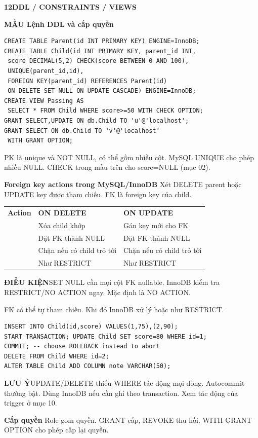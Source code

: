 \documentclass[a4paper]{article}
\newcommand{\sqlfont}{\ttfamily}
\newcommand{\bodyfontsize}{5.55}
\newcommand{\bodyleading}{5.2}
\newlength{\gutter}\setlength{\gutter}{1.5mm}
\newcommand{\bodylineskiplimit}{-2pt}
\newcommand{\bodystyle}{%
  \fontsize{\bodyfontsize}{\bodyleading}\selectfont\setlength{\lineskiplimit}{\bodylineskiplimit}\RaggedRight
  \setlength{\abovedisplayskip}{.5pt}\setlength{\belowdisplayskip}{.5pt}%
  \setlength{\abovedisplayshortskip}{.3pt}\setlength{\belowdisplayshortskip}{.3pt}}
\newcommand{\topic}[2]{\par\addvspace{.45pt}\nointerlineskip%
  \begingroup\setlength{\fboxsep}{0.35pt}%
  \noindent\colorbox{structure}{\parbox{\dimexpr\linewidth-2\fboxsep\relax}{%
    \color{white}\fontsize{6.45}{6.8}\selectfont\bfseries #1\enspace #2}}%
  \endgroup\par\nobreak\vspace{.55pt}\nointerlineskip\nobreak}
\newenvironment{topicblock}
  {\par\bodystyle}
  {\par}
\newcommand{\key}[1]{\par\textcolor{structure}{\textbf{#1}}\enspace}
\newcommand{\note}[4]{\par\nointerlineskip\vspace{.25pt}\begingroup\setlength{\fboxsep}{0.1pt}%
  \noindent\colorbox{#1}{\parbox{\dimexpr\linewidth-2\fboxsep\relax}{%
    \RaggedRight\textcolor{#2}{\textbf{#3}}\enspace #4}}%
  \endgroup\par\nointerlineskip\vspace{.25pt}}
\newcommand{\cond}[1]{\note{conditionbg}{condition}{ĐIỀU KIỆN}{#1}}
\newcommand{\trap}[1]{\note{warningbg}{warning}{LƯU Ý}{#1}}
\newcommand{\pattern}[1]{\key{MẪU #1}}
\newcommand{\sql}[1]{{\sqlfont\color{sqltext}\detokenize{#1}}}
\newlength{\sheetwidth}
\newenvironment{sheetcolumns}[1]
  {\noindent\begin{minipage}[t]{#1\sheetwidth}\vspace{0pt}\bodystyle\ignorespaces}
  {\end{minipage}\par}
\newcommand{\nextcol}[1]{\end{minipage}\hspace{\gutter}%
  \begin{minipage}[t]{#1\sheetwidth}\vspace{0pt}\bodystyle\ignorespaces}
\begin{document}
\begin{sheetcolumns}{.258}
\nextcol{.268}
\begin{topicblock}
\topic{12}{DDL / CONSTRAINTS / VIEWS}
\pattern{Lệnh DDL và cấp quyền}
\begin{lstlisting}
CREATE TABLE Parent(id INT PRIMARY KEY) ENGINE=InnoDB;
CREATE TABLE Child(id INT PRIMARY KEY, parent_id INT,
 score DECIMAL(5,2) CHECK(score BETWEEN 0 AND 100),
 UNIQUE(parent_id,id),
 FOREIGN KEY(parent_id) REFERENCES Parent(id)
 ON DELETE SET NULL ON UPDATE CASCADE) ENGINE=InnoDB;
CREATE VIEW Passing AS
 SELECT * FROM Child WHERE score>=50 WITH CHECK OPTION;
GRANT SELECT,UPDATE ON db.Child TO 'u'@'localhost';
GRANT SELECT ON db.Child TO 'v'@'localhost'
 WITH GRANT OPTION;
\end{lstlisting}
PK là unique và NOT NULL, có thể gồm nhiều cột. MySQL UNIQUE cho phép nhiều NULL. CHECK trong mẫu trên cho score=NULL (mục 02).
\key{Foreign key actions trong MySQL/InnoDB}
Xét DELETE parent hoặc UPDATE key được tham chiếu. FK là foreign key của child.
\par\begingroup\setlength{\tabcolsep}{1.4pt}
\begin{tabular}{@{}lll@{}}
\textbf{Action} & \textbf{ON DELETE} & \textbf{ON UPDATE}\\
\sql{CASCADE} & Xóa child khớp & Gán key mới cho FK\\
\sql{SET NULL} & Đặt FK thành NULL & Đặt FK thành NULL\\
\sql{RESTRICT} & Chặn nếu có child trỏ tới & Chặn nếu có child trỏ tới\\
\sql{NO ACTION} & Như RESTRICT & Như RESTRICT
\end{tabular}\endgroup\par
\cond{SET NULL cần mọi cột FK nullable. InnoDB kiểm tra RESTRICT/NO ACTION ngay. Mặc định là NO ACTION.}
FK có thể tự tham chiếu. Khi đó InnoDB xử lý \sql{ON UPDATE CASCADE} hoặc \sql{ON UPDATE SET NULL} như RESTRICT.
\begin{lstlisting}
INSERT INTO Child(id,score) VALUES(1,75),(2,90);
START TRANSACTION; UPDATE Child SET score=80 WHERE id=1;
COMMIT; -- choose ROLLBACK instead to abort
DELETE FROM Child WHERE id=2;
ALTER TABLE Child ADD COLUMN note VARCHAR(50);
\end{lstlisting}
\trap{UPDATE/DELETE thiếu WHERE tác động mọi dòng. Autocommit thường bật. Dùng InnoDB nếu cần ghi theo transaction. Xem tác động của trigger ở mục 10.}
\key{Cấp quyền}
Role gom quyền. GRANT cấp, REVOKE thu hồi. WITH GRANT OPTION cho phép cấp lại quyền.

\end{topicblock}
\end{sheetcolumns}
\end{document}
